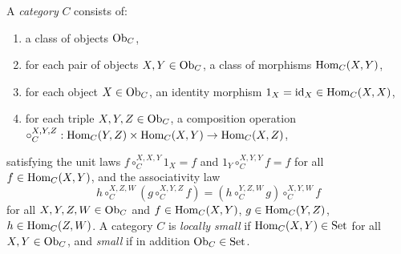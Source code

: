 \documentclass[10pt,a4paper]{article}
\begin{document}
\begin{definition}\label{def:category}
A \emph{category} $C$ consists of:
\begin{enumerate}
\item a class of objects ${\textrm{Ob}}_C$,
\item for each pair of objects $X, Y \in {\textrm{Ob}}_C$, a class of morphisms ${\textrm{Hom}}_C(X,Y)$,
\item for each object $X \in {\textrm{Ob}}_C$, an identity morphism $1_X = {\textrm{id}}_X \in {\textrm{Hom}}_C(X,X)$,
\item for each triple $X, Y, Z \in {\textrm{Ob}}_C$, a composition operation $\circ_C^{X,Y,Z} : {\textrm{Hom}}_C(Y,Z) \times {\textrm{Hom}}_C(X,Y) \to {\textrm{Hom}}_C(X,Z)$,
\end{enumerate}
satisfying the unit laws $f \circ_C^{X,X,Y} 1_X = f$ and $1_Y \circ_C^{X,Y,Y} f = f$ for all $f \in {\textrm{Hom}}_C(X,Y)$, and the associativity law
$$h \circ_C^{X,Z,W} \left(g \circ_C^{X,Y,Z} f\right) = \left(h \circ_C^{Y,Z,W} g\right) \circ_C^{X,Y,W} f$$
for all $X, Y, Z, W \in {\textrm{Ob}}_C$ and $f \in {\textrm{Hom}}_C(X,Y)$, $g \in {\textrm{Hom}}_C(Y,Z)$, $h \in {\textrm{Hom}}_C(Z,W)$. A category $C$ is \emph{locally small} if ${\textrm{Hom}}_C(X,Y) \in {\textrm{Set}}$ for all $X, Y \in {\textrm{Ob}}_C$, and \emph{small} if in addition ${\textrm{Ob}}_C \in {\textrm{Set}}$.
\end{definition}
\end{document}
